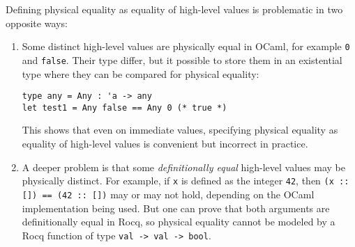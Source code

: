 Defining physical equality as equality of high-level values is problematic in two opposite ways:
\begin{enumerate}
\item Some distinct high-level values are physically equal in OCaml, for example \texttt{0} and \texttt{false}. Their type differ, but it possible to store them in an existential type where they can be compared for physical equality:
\begin{verbatim}
type any = Any : 'a -> any
let test1 = Any false == Any 0 (* true *)
\end{verbatim}
This shows that even on immediate values, specifying physical equality as equality of high-level values is convenient but incorrect in practice.

\item A deeper problem is that some \emph{definitionally equal} high-level values may be physically distinct.
  For example, if \texttt{x} is defined as the integer \texttt{42}, then \texttt{(x :: []) == (42 :: [])} may or may not  hold, depending on the OCaml implementation being used.
  But one can prove that both arguments are definitionally equal in Rocq, so physical equality cannot be modeled by a Rocq function of type \texttt{val -> val -> bool}.
\end{enumerate}

